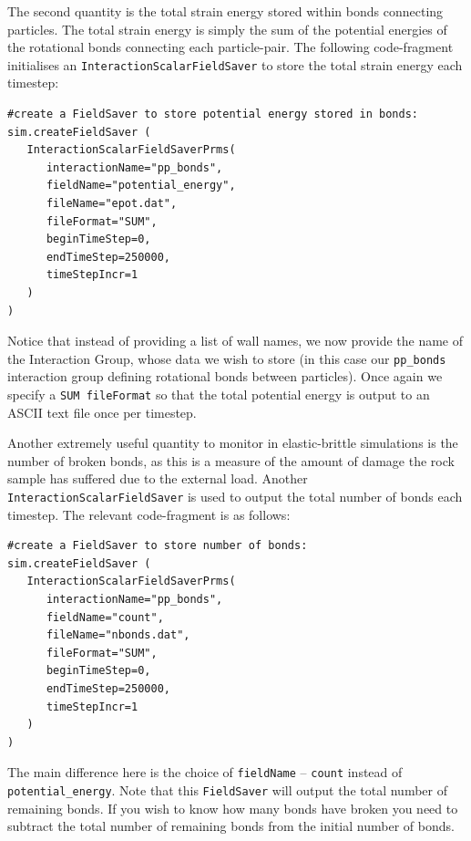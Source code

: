 The second quantity is the total strain energy stored within bonds connecting particles. The total strain energy is simply the sum of the potential energies of the rotational bonds connecting each particle-pair. The following code-fragment initialises an \texttt{InteractionScalarFieldSaver} to store the total strain energy each timestep:

\begin{verbatim}
#create a FieldSaver to store potential energy stored in bonds:
sim.createFieldSaver (
   InteractionScalarFieldSaverPrms(
      interactionName="pp_bonds",
      fieldName="potential_energy",
      fileName="epot.dat",
      fileFormat="SUM",
      beginTimeStep=0,
      endTimeStep=250000,
      timeStepIncr=1
   )
)
\end{verbatim}

\noindent
Notice that instead of providing a list of wall names, we now provide the name of the Interaction Group, whose data we wish to store (in this case our \texttt{pp\_bonds} interaction group defining rotational bonds between particles). Once again we specify a \texttt{SUM fileFormat} so that the total potential energy is output to an ASCII text file once per timestep.

Another extremely useful quantity to monitor in elastic-brittle simulations is the number of broken bonds, as this is a measure of the amount of damage the rock sample has suffered due to the external load. Another \texttt{InteractionScalarFieldSaver} is used to output the total number of bonds each timestep. The relevant code-fragment is as follows:

\begin{verbatim}
#create a FieldSaver to store number of bonds:
sim.createFieldSaver (
   InteractionScalarFieldSaverPrms(
      interactionName="pp_bonds",
      fieldName="count",
      fileName="nbonds.dat",
      fileFormat="SUM",
      beginTimeStep=0,
      endTimeStep=250000,
      timeStepIncr=1
   )
)
\end{verbatim}

\noindent
The main difference here is the choice of \texttt{fieldName} -- \texttt{count} instead of \texttt{potential\_energy}. Note that this \texttt{FieldSaver} will output the total number of remaining bonds. If you wish to know how many bonds have broken you need to subtract the total number of remaining bonds from the initial number of bonds. 

